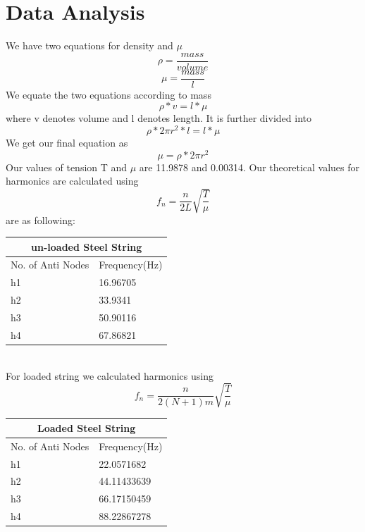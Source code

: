 \section{Data Analysis}
We have two equations for density and $\mu$ $$\rho = \frac{mass}{volume}$$ $$\mu =\frac{mass}{l}$$
We equate the two equations according to mass $$\rho * v = l *\mu$$ where v denotes volume and l denotes length. 
It is further divided into 
$$\rho * 2 \pi r^2 * l= l * \mu$$
We get our final equation as $$\mu = \rho * 2 \pi r^2 $$
Our values of tension T and $\mu $ are 11.9878 and 0.00314. 
Our theoretical values for harmonics are calculated using 
\begin{equation}
    f_n = \frac{n}{2L} \sqrt{\frac{T}{\mu}}
\end{equation}
 are as following: 
\begin{center}
\begin{tabular}{|l|l|}
\hline
\multicolumn{2}{|c|}{\textbf{un-loaded Steel String}} \\ \hline
No. of Anti   Nodes          & Frequency(Hz)          \\ \hline
h1                           & 16.96705               \\ \hline
h2                           & 33.9341                \\ \hline
h3                           & 50.90116               \\ \hline
h4                           & 67.86821               \\ \hline
\end{tabular}
\end{center}
\\
For loaded string we calculated harmonics using 
\begin{equation}
    f_n = \frac{n}{2(N+1)m} \sqrt{\frac{T}{\mu}}
\end{equation}
\begin{center}
\begin{tabular}{|l|l|}
\hline
\multicolumn{2}{|c|}{\textbf{Loaded Steel String}} \\ \hline
No. of Anti   Nodes         & Frequency(Hz)        \\ \hline
h1                          & 22.0571682           \\ \hline
h2                          & 44.11433639          \\ \hline
h3                          & 66.17150459          \\ \hline
h4                          & 88.22867278          \\ \hline
\end{tabular}
\end{center}

